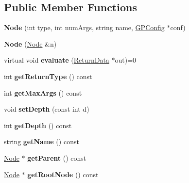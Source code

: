\subsection*{Public Member Functions}
\begin{DoxyCompactItemize}
\item 
\hypertarget{classNode_ae883e3232f71ca37b0523927bf57a7b6}{}\label{classNode_ae883e3232f71ca37b0523927bf57a7b6} 
{\bfseries Node} (int type, int num\+Args, string name, \hyperlink{classGPConfig}{G\+P\+Config} $\ast$conf)
\item 
\hypertarget{classNode_a8264fbb54d07be499bdc93e785f79351}{}\label{classNode_a8264fbb54d07be499bdc93e785f79351} 
{\bfseries Node} (\hyperlink{classNode}{Node} \&n)
\item 
\hypertarget{classNode_aa03774d17d9f331d7fc65c604bd04bc5}{}\label{classNode_aa03774d17d9f331d7fc65c604bd04bc5} 
virtual void {\bfseries evaluate} (\hyperlink{classReturnData}{Return\+Data} $\ast$out)=0
\item 
\hypertarget{classNode_a3bc9da611ff37236175a80c71e9eb350}{}\label{classNode_a3bc9da611ff37236175a80c71e9eb350} 
int {\bfseries get\+Return\+Type} () const
\item 
\hypertarget{classNode_afe50ea7da284533d08ab1c3965b32620}{}\label{classNode_afe50ea7da284533d08ab1c3965b32620} 
int {\bfseries get\+Max\+Args} () const
\item 
\hypertarget{classNode_a6c55a155ccbbcd8d62fb7300c5354715}{}\label{classNode_a6c55a155ccbbcd8d62fb7300c5354715} 
void {\bfseries set\+Depth} (const int d)
\item 
\hypertarget{classNode_a5cf0aef99d92c05310e12966273a0e7c}{}\label{classNode_a5cf0aef99d92c05310e12966273a0e7c} 
int {\bfseries get\+Depth} () const
\item 
\hypertarget{classNode_a33b290707977cb91f336bd7a40a6bd3a}{}\label{classNode_a33b290707977cb91f336bd7a40a6bd3a} 
string {\bfseries get\+Name} () const
\item 
\hypertarget{classNode_a3cad655320d50751c43c5cec9356dcf3}{}\label{classNode_a3cad655320d50751c43c5cec9356dcf3} 
\hyperlink{classNode}{Node} $\ast$ {\bfseries get\+Parent} () const
\item 
\hypertarget{classNode_a7aa7ebe6ad965b1ed545e8b12d823c1d}{}\label{classNode_a7aa7ebe6ad965b1ed545e8b12d823c1d} 
\hyperlink{classNode}{Node} $\ast$ {\bfseries get\+Root\+Node} () const
\item 
\hypertarget{classNode_ad7c28414b0d242ce7c491e22cf006041}{}\label{classNode_ad7c28414b0d242ce7c491e22cf006041} 

\end{DoxyCompactItemize}
